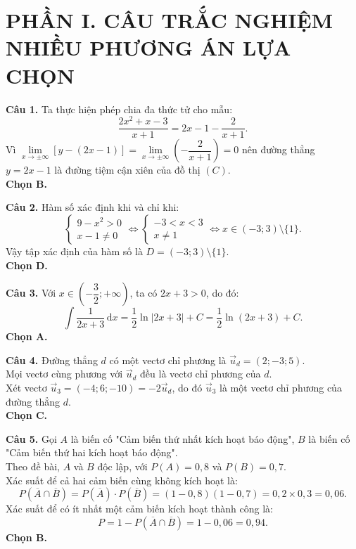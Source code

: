 \documentclass[12pt,a4paper]{article}
\begin{document}
\section*{\large PHẦN I. CÂU TRẮC NGHIỆM NHIỀU PHƯƠNG ÁN LỰA CHỌN}

\noindent\textbf{Câu 1.} Ta thực hiện phép chia đa thức tử cho mẫu:
\[
\dfrac{2x^2 + x - 3}{x + 1} = 2x - 1 - \dfrac{2}{x + 1}.
\]
Vì $\lim\limits_{x \to \pm\infty} \left[ y - (2x - 1) \right] = \lim\limits_{x \to \pm\infty} \left( -\dfrac{2}{x + 1} \right) = 0$ nên đường thẳng $y = 2x - 1$ là đường tiệm cận xiên của đồ thị $(C)$.\\
\textbf{Chọn B.}

\vspace{0.25cm}
\noindent\textbf{Câu 2.} Hàm số xác định khi và chỉ khi:
\[
\begin{cases}
9 - x^2 > 0 \\
x - 1 \ne 0
\end{cases}
\iff
\begin{cases}
-3 < x < 3 \\
x \ne 1
\end{cases}
\iff x \in (-3; 3) \setminus \{1\}.
\]
Vậy tập xác định của hàm số là $D = (-3; 3) \setminus \{1\}$.\\
\textbf{Chọn D.}

\vspace{0.25cm}
\noindent\textbf{Câu 3.} Với $x \in \left(-\dfrac{3}{2}; +\infty\right)$, ta có $2x + 3 > 0$, do đó:
\[
\int \dfrac{1}{2x + 3}\,\text{d}x = \dfrac{1}{2}\ln|2x + 3| + C = \dfrac{1}{2}\ln(2x + 3) + C.
\]
\textbf{Chọn A.}

\vspace{0.25cm}
\noindent\textbf{Câu 4.} Đường thẳng $d$ có một vectơ chỉ phương là $\vec{u}_d = (2; -3; 5)$.\\
Mọi vectơ cùng phương với $\vec{u}_d$ đều là vectơ chỉ phương của $d$.\\
Xét vectơ $\vec{u}_3 = (-4; 6; -10) = -2\vec{u}_d$, do đó $\vec{u}_3$ là một vectơ chỉ phương của đường thẳng $d$.\\
\textbf{Chọn C.}

\vspace{0.25cm}
\noindent\textbf{Câu 5.} Gọi $A$ là biến cố "Cảm biến thứ nhất kích hoạt báo động", $B$ là biến cố "Cảm biến thứ hai kích hoạt báo động".\\
Theo đề bài, $A$ và $B$ độc lập, với $P(A) = 0{,}8$ và $P(B) = 0{,}7$.\\
Xác suất để cả hai cảm biến cùng không kích hoạt là:
\[
P(\overline{A} \cap \overline{B}) = P(\overline{A}) \cdot P(\overline{B}) = (1 - 0{,}8)(1 - 0{,}7) = 0{,}2 \times 0{,}3 = 0{,}06.
\]
Xác suất để có ít nhất một cảm biến kích hoạt thành công là:
\[
P = 1 - P(\overline{A} \cap \overline{B}) = 1 - 0{,}06 = 0{,}94.
\]
\textbf{Chọn B.}
\end{document}
